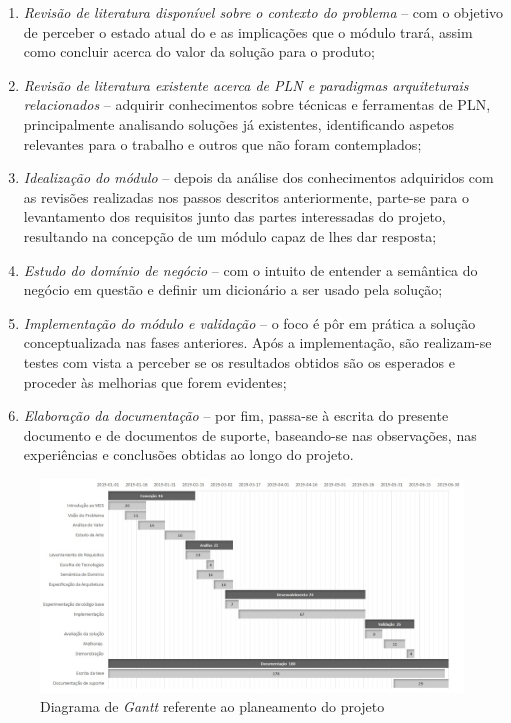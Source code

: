 \begin{enumerate}
    \item 
    {
        \textit{Revisão de literatura disponível sobre o contexto do problema} -- com o objetivo de perceber o estado atual do {\productname} e as implicações que o módulo trará, assim como concluir acerca do valor da solução para o produto;
    }
    \item
    {
        \textit{Revisão de literatura existente acerca de \gls{PLN} e paradigmas arquiteturais relacionados} -- adquirir conhecimentos sobre técnicas e ferramentas de \gls{PLN}, principalmente analisando soluções já existentes, identificando aspetos relevantes para o trabalho e outros que não foram contemplados;
    }
    \item
    {
        \textit{Idealização do módulo} -- depois da análise dos conhecimentos adquiridos com as revisões realizadas nos passos descritos anteriormente, parte-se para o levantamento dos requisitos junto das partes interessadas do projeto, resultando na concepção de um módulo capaz de lhes dar resposta; 
    }
    \item
    {
        \textit{Estudo do domínio de negócio} -- com o intuito de entender a semântica do negócio em questão e definir um dicionário a ser usado pela solução;
    }
    \item
    {
        \textit{Implementação do módulo e validação} -- o foco é pôr em prática a solução conceptualizada nas fases anteriores. Após a implementação, são realizam-se testes com vista a perceber se os resultados obtidos são os esperados e proceder às melhorias que forem evidentes;
    }
    \item
    {
        \textit{Elaboração da documentação} --  por fim, passa-se à escrita do presente documento e de documentos de suporte, baseando-se nas observações, nas experiências e conclusões obtidas ao longo do projeto.
    }
\end{enumerate}

\clearpage
\begin{figure}
    \centering
    \includegraphics[width=1.0\textwidth]
    {pre-thesis/assets/gantt.jpg}
    \caption{Diagrama de \textit{Gantt} referente ao planeamento do projeto}
    \label{fig:planning-gantt_chart}
\end{figure}
\clearpage
